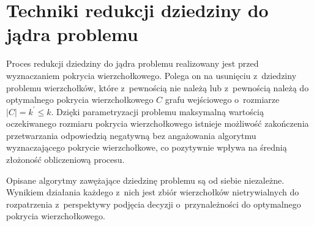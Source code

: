 \section{Techniki redukcji dziedziny do jądra problemu}\label{s_kernelization}

Proces redukcji dziedziny do jądra problemu realizowany jest przed wyznaczaniem pokrycia wierzchołkowego. 
Polega on na usunięciu z~dziedziny problemu wierzchołków, które z~pewnością nie należą lub z~pewnością należą do optymalnego pokrycia wierzchołkowego $C$ grafu wejściowego o~rozmiarze $|C| = k^\prime \leq k$.
Dzięki parametryzacji problemu maksymalną wartością oczekiwanego rozmiaru pokrycia wierzchołkowego istnieje możliwość zakończenia przetwarzania odpowiedzią negatywną bez
angażowania algorytmu wyznaczającego pokrycie wierzchołkowe, co pozytywnie wpływa na średnią złożoność obliczeniową procesu.

Opisane algorytmy zawężające dziedzinę problemu są od siebie niezależne.
Wynikiem działania każdego z~nich jest zbiór wierzchołków nietrywialnych do
rozpatrzenia z~perspektywy podjęcia decyzji o~przynależności do optymalnego
pokrycia wierzchołkowego.






